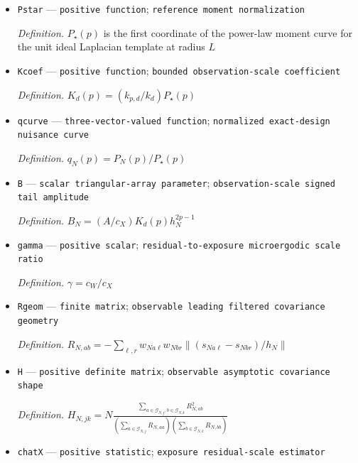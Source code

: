 \documentclass{article}
\begin{document}
\begin{itemize}
  \par\smallskip\noindent\emph{Definition.} \(P_{N,j}(p)=\frac{-\sum_{a\in\mathcal G_{N,j}}\sum_{\ell,r}w_{Nja\ell}w_{Njar}\|(s_{Nja\ell}-s_{Njar})/h_N\|^{2p}}{-\sum_{a\in\mathcal G_{N,j}}\sum_{\ell,r}w_{Nja\ell}w_{Njar}\|(s_{Nja\ell}-s_{Njar})/h_N\|}\)
  \item \texttt{Pstar} --- \texttt{positive function}; \texttt{reference moment normalization}
  \par\smallskip\noindent\emph{Definition.} \(P_{\star}(p)\) is the first coordinate of the power-law moment curve for the unit ideal Laplacian template at radius \(L\)
  \item \texttt{Kcoef} --- \texttt{positive function}; \texttt{bounded observation-\allowbreak{}scale coefficient}
  \par\smallskip\noindent\emph{Definition.} \(K_d(p)=(k_{p,d}/k_d)P_{\star}(p)\)
  \item \texttt{qcurve} --- \texttt{three-\allowbreak{}vector-\allowbreak{}valued function}; \texttt{normalized exact-\allowbreak{}design nuisance curve}
  \par\smallskip\noindent\emph{Definition.} \(q_N(p)=P_N(p)/P_{\star}(p)\)
  \item \texttt{B} --- \texttt{scalar triangular-\allowbreak{}array parameter}; \texttt{observation-\allowbreak{}scale signed tail amplitude}
  \par\smallskip\noindent\emph{Definition.} \(B_N=(A/c_X)K_d(p)h_N^{2p-1}\)
  \item \texttt{gamma} --- \texttt{positive scalar}; \texttt{residual-\allowbreak{}to-\allowbreak{}exposure microergodic scale ratio}
  \par\smallskip\noindent\emph{Definition.} \(\gamma=c_W/c_X\)
  \item \texttt{Rgeom} --- \texttt{finite matrix}; \texttt{observable leading filtered covariance geometry}
  \par\smallskip\noindent\emph{Definition.} \(R_{N,ab}=-\sum_{\ell,r}w_{Na\ell}w_{Nbr}\|(s_{Na\ell}-s_{Nbr})/h_N\|\)
  \item \texttt{H} --- \texttt{positive definite matrix}; \texttt{observable asymptotic covariance shape}
  \par\smallskip\noindent\emph{Definition.} \(H_{N,jk}=N\frac{\sum_{a\in\mathcal G_{N,j},b\in\mathcal G_{N,k}}R_{N,ab}^2}{(\sum_{a\in\mathcal G_{N,j}}R_{N,aa})(\sum_{b\in\mathcal G_{N,k}}R_{N,bb})}\)
  \item \texttt{chatX} --- \texttt{positive statistic}; \texttt{exposure residual-\allowbreak{}scale estimator}

\end{itemize}
\end{document}
